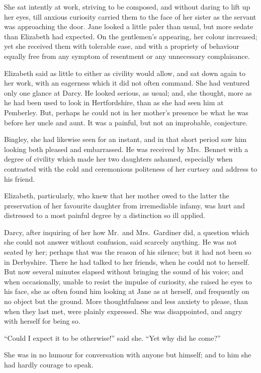 She sat intently at work, striving to be composed, and without
daring to lift up her eyes, till anxious curiosity carried them
to the face of her sister as the servant was approaching the
door.  Jane looked a little paler than usual, but more sedate
than Elizabeth had expected.  On the gentlemen's appearing, her
colour increased; yet she received them with tolerable ease,
and with a propriety of behaviour equally free from any symptom
of resentment or any unnecessary complaisance.

Elizabeth said as little to either as civility would allow, and
sat down again to her work, with an eagerness which it did not
often command.  She had ventured only one glance at Darcy.  He
looked serious, as usual; and, she thought, more as he had been
used to look in Hertfordshire, than as she had seen him at
Pemberley.  But, perhaps he could not in her mother's presence
be what he was before her uncle and aunt.  It was a painful,
but not an improbable, conjecture.

Bingley, she had likewise seen for an instant, and in that
short period saw him looking both pleased and embarrassed.  He
was received by Mrs.\ Bennet with a degree of civility which
made her two daughters ashamed, especially when contrasted with
the cold and ceremonious politeness of her curtsey and address
to his friend.

Elizabeth, particularly, who knew that her mother owed to the
latter the preservation of her favourite daughter from
irremediable infamy, was hurt and distressed to a most painful
degree by a distinction so ill applied.

Darcy, after inquiring of her how Mr.\ and Mrs.\ Gardiner did, a
question which she could not answer without confusion, said
scarcely anything.  He was not seated by her; perhaps that
was the reason of his silence; but it had not been so in
Derbyshire.  There he had talked to her friends, when he could
not to herself.  But now several minutes elapsed without
bringing the sound of his voice; and when occasionally, unable
to resist the impulse of curiosity, she raised he eyes to his
face, she as often found him looking at Jane as at herself, and
frequently on no object but the ground.  More thoughtfulness
and less anxiety to please, than when they last met, were
plainly expressed.  She was disappointed, and angry with
herself for being so.

``Could I expect it to be otherwise!'' said she.  ``Yet why did
he come?''

She was in no humour for conversation with anyone but himself;
and to him she had hardly courage to speak.

